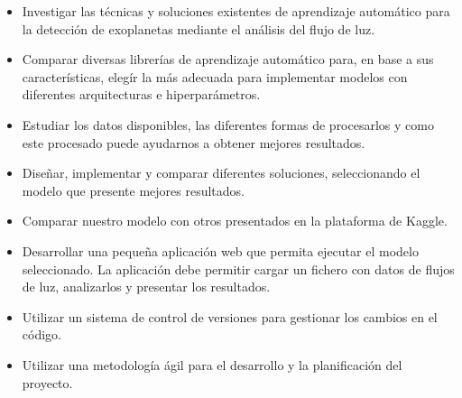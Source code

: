 \label{sec:objetivos-del-proyecto}

\begin{itemize}
    \item Investigar las técnicas y soluciones existentes de aprendizaje automático para la detección de exoplanetas mediante el análisis del flujo de luz.
    \item Comparar diversas librerías de aprendizaje automático para, en base a sus características, elegír la más adecuada para implementar modelos con diferentes arquitecturas e hiperparámetros.
    \item Estudiar los datos disponibles, las diferentes formas de procesarlos y como este procesado puede ayudarnos a obtener mejores resultados.
    \item Diseñar, implementar y comparar diferentes soluciones, seleccionando el modelo que presente mejores resultados.
    \item Comparar nuestro modelo con otros presentados en la plataforma de Kaggle.
    \item Desarrollar una pequeña aplicación web que permita ejecutar el modelo seleccionado. La aplicación debe permitir cargar un fichero con datos de flujos de luz, analizarlos y presentar los resultados.
    \item Utilizar un sistema de control de versiones para gestionar los cambios en el código.
    \item Utilizar una metodología ágil para el desarrollo y la planificación del proyecto.
\end{itemize}
